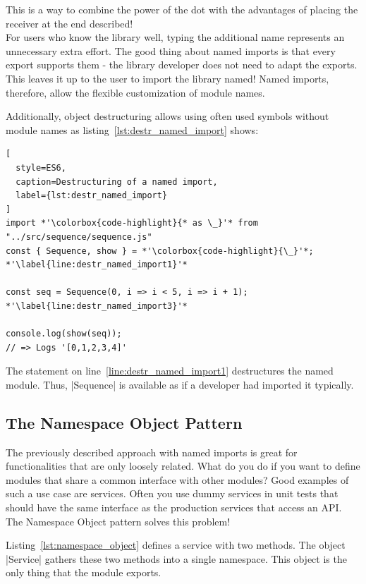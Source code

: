 This is a way to combine the power of the dot with the advantages of placing
the receiver at the end described! \\
For users who know the library well, typing the additional name represents an
unnecessary extra effort. The good thing about named imports is that every
export supports them - the library developer does not need to adapt the
exports. \\
This leaves it up to the user to import the library named! Named
imports, therefore, allow the flexible customization of module names.

Additionally, object destructuring allows using often used symbols without
module names as listing~\ref{lst:destr_named_import} shows:

\begin{lstlisting}[
  style=ES6,
  caption=Destructuring of a named import,
  label={lst:destr_named_import}
]
import *'\colorbox{code-highlight}{* as \_}'* from "../src/sequence/sequence.js" 
const { Sequence, show } = *'\colorbox{code-highlight}{\_}'*; *'\label{line:destr_named_import1}'*

const seq = Sequence(0, i => i < 5, i => i + 1); *'\label{line:destr_named_import3}'*

console.log(show(seq));
// => Logs '[0,1,2,3,4]'
\end{lstlisting}

The statement on line~\ref{line:destr_named_import1} destructures the named
module. Thus, |Sequence| is available as if a developer had imported it
typically.


\subsection{The Namespace Object Pattern} %
\label{sub:The Namespace Object Pattern}
The previously described approach with named imports is great for
functionalities that are only loosely related. What do you do if you want to
define modules that share a common interface with other modules? Good examples
of such a use case are services. Often you use dummy services in unit tests
that should have the same interface as the production services that access an
API. The Namespace Object pattern solves this problem!

Listing~\ref{lst:namespace_object} defines a service with two methods. The
object |Service| gathers these two methods into a single namespace. This object
is the only thing that the module exports.


